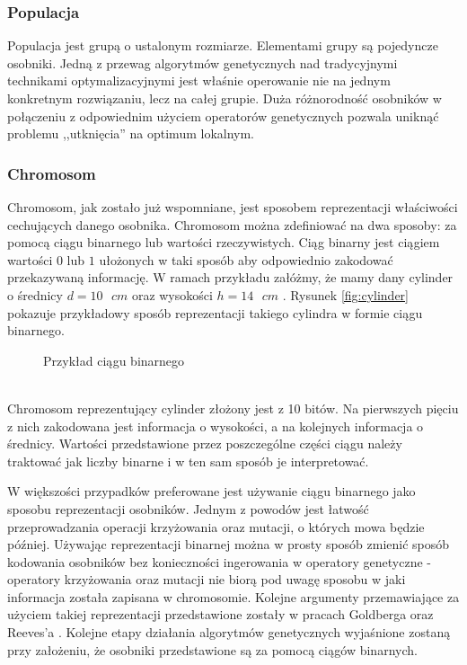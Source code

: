 \documentclass[twoside]{iisthesis}
\begin{document}
\subsubsection{Populacja}
Populacja jest grupą o ustalonym rozmiarze. Elementami grupy są pojedyncze osobniki. Jedną z przewag algorytmów genetycznych nad tradycyjnymi technikami optymalizacyjnymi jest właśnie operowanie nie na jednym konkretnym rozwiązaniu, lecz na całej grupie. Duża różnorodność osobników w połączeniu z odpowiednim użyciem operatorów genetycznych pozwala uniknąć problemu ,,utknięcia'' na optimum lokalnym.
\subsubsection{Chromosom}
Chromosom, jak zostało już wspomniane, jest sposobem reprezentacji właściwości cechujących danego osobnika. Chromosom można zdefiniować na dwa sposoby: za pomocą ciągu binarnego lub wartości rzeczywistych. Ciąg binarny jest ciągiem wartości $0$ lub $1$ ułożonych w taki sposób aby odpowiednio zakodować przekazywaną informację. W ramach przykładu załóżmy, że mamy dany cylinder o średnicy $d = 10\text{ }cm$ oraz wysokości $h = 14\text{ }cm$ \cite{book}. Rysunek \eqref{fig:cylinder} pokazuje przykładowy sposób reprezentacji takiego cylindra w formie ciągu binarnego. 
\begin{figure}[!htb]
	\centering
	\caption{Przykład ciągu binarnego}
	\label{fig:cylinder}
\end{figure}
\\Chromosom reprezentujący cylinder złożony jest z 10 bitów. Na pierwszych pięciu z nich zakodowana jest informacja o wysokości, a na kolejnych informacja o średnicy. Wartości przedstawione przez poszczególne części ciągu należy traktować jak liczby binarne i w ten sam sposób je interpretować.

W większości przypadków preferowane jest używanie ciągu binarnego jako sposobu reprezentacji osobników. Jednym z powodów jest łatwość przeprowadzania operacji krzyżowania oraz mutacji, o których mowa będzie później. Używając reprezentacji binarnej można w prosty sposób zmienić sposób kodowania osobników bez konieczności ingerowania w operatory genetyczne - operatory krzyżowania oraz mutacji nie biorą pod uwagę sposobu w jaki informacja została zapisana w chromosomie. Kolejne argumenty przemawiające za użyciem takiej reprezentacji przedstawione zostały w pracach Goldberga \cite{goldberg} oraz Reeves'a \cite{reeves}. Kolejne etapy działania algorytmów genetycznych wyjaśnione zostaną przy założeniu, że osobniki przedstawione są za pomocą ciągów binarnych.
\end{document}
